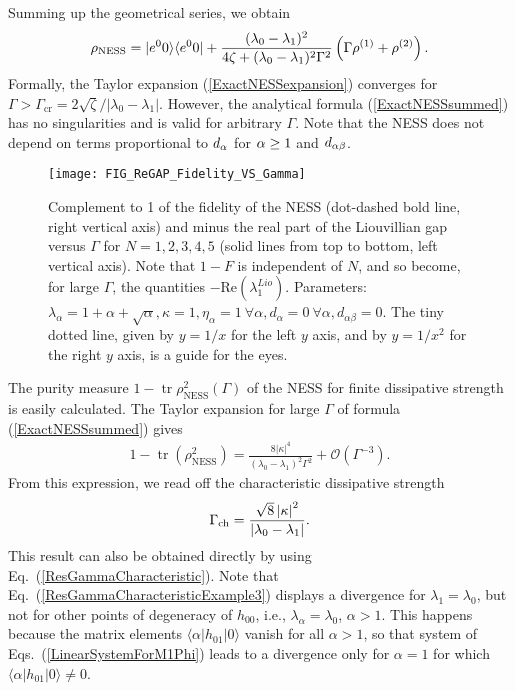 \documentclass[aps,pra,letterpaper,twocolumn,showpacs,superscriptaddress,floatfix,longbibliography]{revtex4-1}
\newcommand{\tr}{\mathop{\mathrm{tr}}\limits}
\begin{document}
Summing up the geometrical series, we obtain
\begin{align}
  \rho_\mathrm{NESS} = |{e^{0}0}\rangle\langle{e^{0}0}| +
  \frac{(\lambda_0-\lambda_1)^{2}}
  {4\zeta+(\lambda_0-\lambda_1)^{2}\Gamma^{2}}
  \left(\Gamma\rho^{\left(1\right)}+\rho^{\left(2\right)}\right).
  \label{ExactNESSsummed}
\end{align}
Formally, the Taylor expansion (\ref{ExactNESSexpansion}) converges
for $\Gamma>
\Gamma_\mathrm{cr}=2\sqrt{\zeta}/|\lambda_0-\lambda_1|$. However, the
analytical formula (\ref{ExactNESSsummed}) has no singularities and is
valid for arbitrary $\Gamma$.  Note that the NESS does not depend on
terms proportional to $d_\alpha$ for $\alpha\geq 1$ and $d_{\alpha \beta}$.

\begin{figure}[t]
  \begin{center}
    \texttt{[image: FIG\_ReGAP\_Fidelity\_VS\_Gamma]}
    \caption{ Complement to 1 of the fidelity of the NESS (dot-dashed
      bold line, right vertical axis) and minus the real part of the
      Liouvillian gap versus $\Gamma$ for $N=1,2,3,4,5$ (solid lines
      from top to bottom, left vertical axis).  Note that $1-F$ is
      independent of $N$, and so become, for large $\Gamma$, the
      quantities $-\mathrm{Re}(\lambda_1^{Lio})$.  Parameters:
      $\lambda_{\alpha}=1+\alpha+\sqrt{\alpha},\kappa=1,\eta_{\alpha}=1\
      \forall\alpha, d_{\alpha}=0\ \forall\alpha,
      d_{\alpha\beta}=0$. The tiny dotted line, given by $y=1/x$ for
      the left $y$ axis, and by $y=1/x^2$ for the right $y$ axis, is a
      guide for the eyes.  }
    \label{Fig_Fidelity&Gap_vs_Gamma}
  \end{center}
\end{figure}

The purity measure $1-\tr\rho^2_\mathrm{NESS}(\Gamma)$ of the NESS for
finite dissipative strength is easily calculated.  The Taylor
expansion for large $\Gamma$ of formula (\ref{ExactNESSsummed}) gives
\begin{align}
  1-\tr\left(\rho_\mathrm{NESS}^{2}\right) =
  \frac{8\left|\kappa\right|^{4}}{(\lambda_0-\lambda_1)^{2}\Gamma^{2}}
  +\mathcal{O}\left(\Gamma^{-3}\right).
  \label{Tr(r-rr)INF}%
\end{align}
From this expression, we read off the characteristic dissipative
strength
\begin{align}
  \Gamma_\mathrm{ch} = \frac{ \sqrt{8} \left|\kappa\right|^{2}}
  {\left|\la_0-\la_1\right|}.
  \label{ResGammaCharacteristicExample3}%
\end{align}
This result can also be obtained directly by using
Eq.~(\ref{ResGammaCharacteristic}).  Note that
Eq.~(\ref{ResGammaCharacteristicExample3}) displays a divergence for
$\lambda_1=\lambda_0$, but not for other points of degeneracy of
$h_{00}$, i.e., $\lambda_\alpha=\lambda_0$, $\alpha>1$. This happens
because the matrix elements $\langle\alpha|h_{01}|0\rangle$ vanish for
all $\alpha>1$, so that system of Eqs.~(\ref{LinearSystemForM1Phi})
leads to a divergence only for $\alpha=1$ for which
$\langle\alpha|h_{01}|0\rangle \neq 0$.
\end{document}
